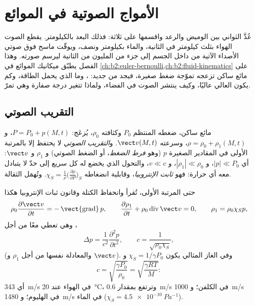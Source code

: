\chapter{الأمواج الصوتية في الموائع}\label{ch:b2:sound-waves}

عُدَّ الثواني بين الوميض والرعد واقسمها على ثلاثة: فذلك البعد
بالكيلومتر. يقطع الصوت الهواء بثلث كيلومتر في الثانية، والماء
بكيلومتر ونصف، ويوقّت ماسح فوق صوتي الأصداء الآتية من داخل
الجسم إلى جزء من المليون من الثانية ليرسم صورته. وهذا الفصل
يطبّق ميكانيك الموائع في
\cref{ch:b2:euler-bernoulli,ch:b2:fluid-kinematics}
على مائع ساكن تزعجه تموّجة ضغط صغيرة، فيجد  من
جديد: ، وما الذي يحمل الطاقة، وكم يكون العالي
عاليًا، وكيف ينتشر الصوت في الفضاء، ولماذا تتغير درجة صفارة
وهي تمرّ.

\section{التقريب الصوتي}

\begin{definition}\label{def:b2:sound-waves:approximation}
مائع ساكن، ضغطه المنتظم $P_0$ وكثافته $\rho_0$، يُزعَج:
$P = P_0 + p(M, t)$، و $\rho = \rho_0 + \rho_1(M, t)$، وسرعته
$\vect v(M, t)$. و\emph{التقريب الصوتي} لا يحتفظ إلا بالمرتبة
الأولى في المقادير الصغيرة $p$ (وهو \emph{فرط الضغط}، أو الضغط
الصوتي) و $\rho_1$ و $\vect v$: أي $|p| \ll P_0$، و $|\rho_1| \ll \rho_0$، و $v \ll c$،
والتحول الذي يخضع له كل  سريع إلى حدّ
لا يتبادل معه أي حرارة: فهو \emph{ثابت الإنتروبيا}، وقابلية
انضغاطه $\chi_S = \frac1\rho\bigl(\frac{\partial\rho}{\partial P}\bigr)_S$.
وتُهمَل الثقالة.
\end{definition}

\begin{theorem}\label{thm:b2:sound-waves:equation}
حتى المرتبة الأولى، تُقرأ  وانحفاظ الكتلة وقانون
ثبات الإنتروبيا هكذا
\[
\rho_0\frac{\partial\vect v}{\partial t} = -\operatorname{\vect{grad}}p , \qquad
\frac{\partial\rho_1}{\partial t} + \rho_0\operatorname{div}\vect v = 0 , \qquad
\rho_1 = \rho_0\chi_Sp ,
\]
وهي تعطي معًا  من أجل ،
\[
\Delta p = \frac1{c^2}\frac{\partial^2p}{\partial t^2} , \qquad
c = \frac1{\sqrt{\rho_0\chi_S}} ,
\]
(والمعادلة نفسها من أجل $\rho_1$ و $\vect v$). وفي الغاز المثالي يكون $\chi_S =
1/\gamma P_0$ و
\[
c = \sqrt{\frac{\gamma P_0}{\rho_0}} = \sqrt{\frac{\gamma RT}{M}} :
\]
أي \qty{343}{m/s} في الهواء عند \qty{20}{\degreeCelsius}، وترتفع بمقدار \qty{0.6}{m/s}
في الكلفن؛ و \qty{1000}{m/s} في الهليوم؛ و \qty{1480}{m/s} في الماء ($\chi_S =
\qty{4.5e-10}{Pa^{-1}}$).
\end{theorem}


